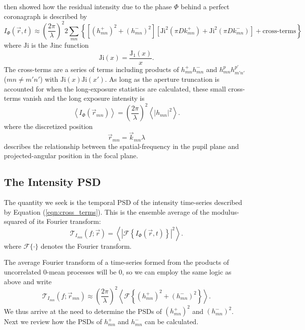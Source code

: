 \documentclass[11pt,preprint]{aastex}
\newcommand{\Ji}{\mathrm{Ji}}
\begin{document}
\citet{2018JATIS...4a9001M} then showed how the residual intensity due to the phase $\Phi$ behind a perfect coronagraph is described by
\begin{equation}
I_\Phi(\vec{r},t) \approx \left(\frac{2\pi}{\lambda}\right)^2 2 \sum_{mn} \left\{  \left[ (h_{mn}^{+})^2 + (h_{mn}^{-})^2 \right] \left[ \Ji^2(\pi D k_{mn}^+) +\Ji^2(\pi D k_{mn}^-)\right] + \mbox{cross-terms} \right\}
\label{eqn:cross_terms}
\end{equation}
where $\Ji$ is the Jinc function
\begin{equation}
\Ji(x) = \frac{\mathrm{J}_1(x)}{x}.
\end{equation}
The cross-terms are a series of terms including products of $h_{mn}^+h_{mn}^-$ and $h_{mn}^ph_{m'n'}^{p'}$ ($mn \neq m'n'$) with $\Ji(x)\Ji(x')$. As long as the aperture truncation is accounted for when the long-exposure statistics are calculated,  these small cross-terms vanish and the long exposure intensity is 
\begin{equation}
\left< I_\Phi(\vec{r}_{mn}) \right> =  \left(\frac{2\pi}{\lambda}\right)^2\left< |h_{mn}|^2 \right> .
\label{eqn:contrast_h2}
\end{equation}
where the discretized position 
\begin{equation}
\vec{r}_{mn} = \vec{k}_{mn} \lambda
\end{equation}
describes the relationship between the spatial-frequency in the pupil plane and projected-angular position in the focal plane.

\subsection{The Intensity PSD}

The quantity we seek is the temporal PSD of the intensity time-series described by Equation (\ref{eqn:cross_terms}).  This is the ensemble average of the modulus-squared of its Fourier transform:
\begin{equation}
\mathcal{T}_{I_{mn}}(f;\vec{r}) = \left\langle \left| \mathcal{F} \left\{ I_\Phi(\vec{r},t) \right\} \right|^2 \right\rangle.
\end{equation}
where $\mathcal{F}\{\cdot\}$ denotes the Fourier transform.

The average Fourier transform of a time-series formed from the products of uncorrelated 0-mean processes will be 0, so we can employ the same logic as above and write
\begin{equation}
\mathcal{T}_{I_{mn}}(f;\vec{r}_{mn}) \approx \left(\frac{2\pi}{\lambda}\right)^2  \left\langle \mathcal{F}\left\{  (h_{mn}^{+})^2 + (h_{mn}^{-})^2  \right\} \right\rangle  .
\label{eqn:psd_h2}
\end{equation}
We thus arrive at the need to determine the PSDs of $(h_{mn}^{+})^2$ and $(h_{mn}^{-})^2$.  Next we review how the PSDs of $h_{mn}^{+}$ and $h_{mn}^{-}$ can be calculated.
\end{document}
